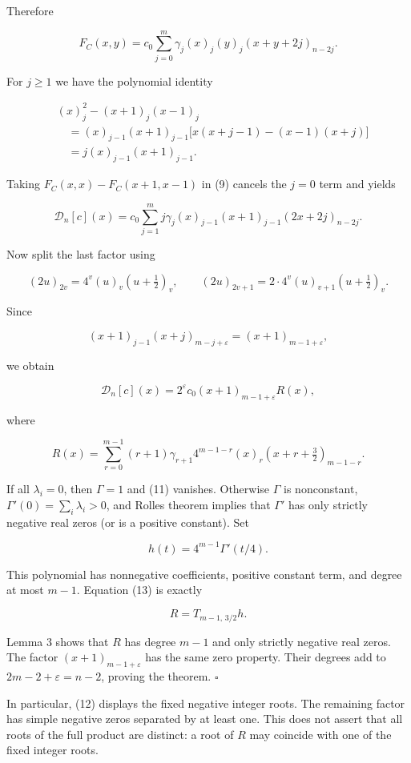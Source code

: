 \documentclass[11pt]{article}
\begin{document}
Therefore

\[
F_C(x,y)=c_0\sum_{j=0}^m\gamma_j
(x)_j(y)_j(x+y+2j)_{n-2j}.
\tag{9}
\]

For \(j\ge1\) we have the polynomial identity

\[
\begin{aligned}
&(x)_j^2-(x+1)_j(x-1)_j\\
&\quad=(x)_{j-1}(x+1)_{j-1}
\bigl[x(x+j-1)-(x-1)(x+j)\bigr]\\
&\quad=j(x)_{j-1}(x+1)_{j-1}.
\end{aligned}
\tag{10}
\]

Taking \(F_C(x,x)-F_C(x+1,x-1)\) in (9) cancels the \(j=0\) term and
yields

\[
\mathcal D_n[c](x)=c_0\sum_{j=1}^m
j\gamma_j(x)_{j-1}(x+1)_{j-1}(2x+2j)_{n-2j}.
\tag{11}
\]

Now split the last factor using

\[
(2u)_{2v}=4^v(u)_v(u+\tfrac12)_v,
\qquad
(2u)_{2v+1}=2\cdot4^v(u)_{v+1}(u+\tfrac12)_v.
\]

Since

\[
(x+1)_{j-1}(x+j)_{m-j+\varepsilon}
=(x+1)_{m-1+\varepsilon},
\]

we obtain

\[
\mathcal D_n[c](x)=2^\varepsilon c_0
(x+1)_{m-1+\varepsilon}R(x),
\tag{12}
\]

where

\[
R(x)=\sum_{r=0}^{m-1}(r+1)\gamma_{r+1}4^{m-1-r}
(x)_r(x+r+\tfrac32)_{m-1-r}.
\tag{13}
\]

If all \(\lambda_i=0\), then \(\Gamma=1\) and (11) vanishes. Otherwise
\(\Gamma\) is nonconstant, \(\Gamma'(0)=\sum_i\lambda_i>0\), and
Rolle\textquotesingle s theorem implies that \(\Gamma'\) has only
strictly negative real zeros (or is a positive constant). Set

\[
h(t)=4^{m-1}\Gamma'(t/4).
\tag{14}
\]

This polynomial has nonnegative coefficients, positive constant term,
and degree at most \(m-1\). Equation (13) is exactly

\[
R=T_{m-1,\,3/2}h.
\]

Lemma 3 shows that \(R\) has degree \(m-1\) and only strictly negative
real zeros. The factor \((x+1)_{m-1+\varepsilon}\) has the same zero
property. Their degrees add to \(2m-2+\varepsilon=n-2\), proving the
theorem. \(\square\)

In particular, (12) displays the fixed negative integer roots. The
remaining factor has simple negative zeros separated by at least one.
This does not assert that all roots of the full product are distinct: a
root of \(R\) may coincide with one of the fixed integer roots.
\end{document}
